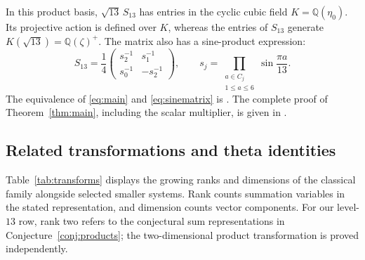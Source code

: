 \documentclass[11pt,reqno]{amsart}
\theoremstyle{remark}
\numberwithin{equation}{section}
\newcommand{\QQ}{\mathbb Q}
\begin{document}
In this product basis, $\sqrt{13}\,S_{13}$ has entries in the cyclic cubic
field $K=\QQ(\eta_0)$. Its projective action is defined over $K$, whereas
the entries of $S_{13}$ generate $K(\sqrt{13})=\QQ(\zeta)^+$.
The matrix also has a sine-product expression:
\begin{equation}\label{eq:sinematrix}
 S_{13}=\frac14
 \begin{pmatrix}s_2^{-1}&s_1^{-1}\\s_0^{-1}&-s_2^{-1}\end{pmatrix},
 \qquad
 s_j=\prod_{\substack{a\in C_j\\1\leq a\leq6}}
 \sin\frac{\pi a}{13}.
\end{equation}
The equivalence of \eqref{eq:main} and \eqref{eq:sinematrix} is
\cite[Lemma~3.3]{FrickeCompanion}. The complete proof of
Theorem~\ref{thm:main}, including the scalar multiplier, is given in
\cite[Sections~2--6]{FrickeCompanion}.

\subsection{Related transformations and theta identities}\label{sec:related}
Table~\ref{tab:transforms} displays the growing ranks and dimensions of
the classical family alongside selected smaller systems. Rank counts
summation variables in the stated representation, and dimension counts
vector components. For our level-$13$ row, rank two refers to the
conjectural sum representations in Conjecture~\ref{conj:products};
the two-dimensional product transformation is proved independently.
\end{document}
